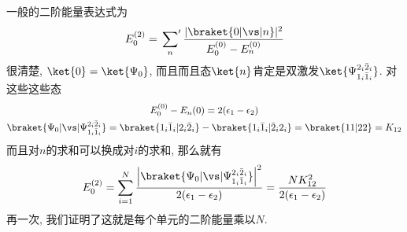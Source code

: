 一般的二阶能量表达式为
\begin{align}
E_0^{(2)} = \sideset{}{'}\sum_n \frac{|\braket{0|\vs|n}|^2}{E_0^{(0)}-E_n^{(0)}}
\end{align}
很清楚, 
$\ket{0}=\ket{\Psi_0}$,
而且而且态$\ket{n}$肯定是双激发$\ket{\Psi_{1_i\bar{1}_i}^{2_i\bar{2}_i}}$. 
对这些这些态
\begin{subequations}
	\begin{gather}
	E_0^{(0)} - E_n{(0)} = 2(\epsilon_1 - \epsilon_2)
	\label{6.83a}\\
	\braket{\Psi_0|\vs|\Psi_{1_i\bar{1}_i}^{2_i\bar{2}_i}} = \braket{1_i\bar{1}_i | 2_i\bar{2}_i} - \braket{1_i\bar{1}_i|\bar{2}_i2_i} = \braket{11|22}=K_{12}
	\label{6.83b}
\end{gather}
\end{subequations}
而且对$n$的求和可以换成对$i$的求和, 
那么就有
\begin{align}
E_0^{(2)} = \sum_{i=1}^{N} \frac{\left|\braket{\Psi_0|\vs|\Psi_{1_i\bar{1}_i}^{2_i\bar{2}_i}}\right|^2}{2(\epsilon_1-\epsilon_2)} = \frac{NK_{12}^2}{2(\epsilon_1-\epsilon_2)}
\end{align}
再一次, 
我们证明了这就是每个单元的二阶能量乘以$N$.



